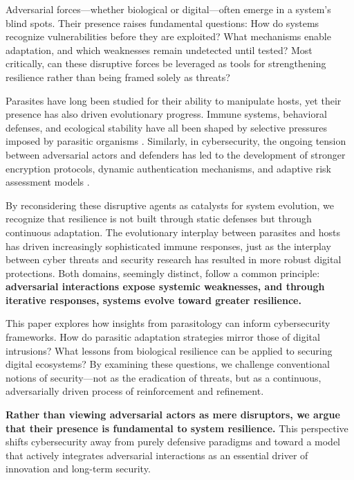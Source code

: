\documentclass{article}
\begin{document}
Adversarial forces—whether biological or digital—often emerge in a system’s blind spots. Their presence raises fundamental questions: How do systems recognize vulnerabilities before they are exploited? What mechanisms enable adaptation, and which weaknesses remain undetected until tested? Most critically, can these disruptive forces be leveraged as tools for strengthening resilience rather than being framed solely as threats? 

Parasites have long been studied for their ability to manipulate hosts, yet their presence has also driven evolutionary progress. Immune systems, behavioral defenses, and ecological stability have all been shaped by selective pressures imposed by parasitic organisms \citep{morens2020emerging, schmid2014antigenic}. Similarly, in cybersecurity, the ongoing tension between adversarial actors and defenders has led to the development of stronger encryption protocols, dynamic authentication mechanisms, and adaptive risk assessment models \citep{shostack2014threatmodeling, barabasi2016network}. 

By reconsidering these disruptive agents as catalysts for system evolution, we recognize that resilience is not built through static defenses but through continuous adaptation. The evolutionary interplay between parasites and hosts has driven increasingly sophisticated immune responses, just as the interplay between cyber threats and security research has resulted in more robust digital protections. Both domains, seemingly distinct, follow a common principle: \textbf{adversarial interactions expose systemic weaknesses, and through iterative responses, systems evolve toward greater resilience.}

This paper explores how insights from parasitology can inform cybersecurity frameworks. How do parasitic adaptation strategies mirror those of digital intrusions? What lessons from biological resilience can be applied to securing digital ecosystems? By examining these questions, we challenge conventional notions of security—not as the eradication of threats, but as a continuous, adversarially driven process of reinforcement and refinement. 

\textbf{Rather than viewing adversarial actors as mere disruptors, we argue that their presence is fundamental to system resilience.} This perspective shifts cybersecurity away from purely defensive paradigms and toward a model that actively integrates adversarial interactions as an essential driver of innovation and long-term security.
\end{document}
